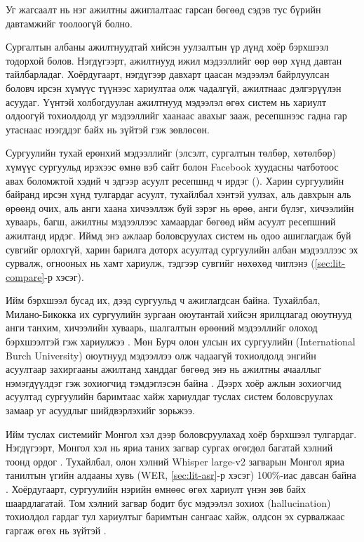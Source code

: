 Уг жагсаалт нь нэг ажилтны ажиглалтаас гарсан бөгөөд сэдэв тус бүрийн давтамжийг тоолоогүй болно.

Сургалтын албаны ажилтнуудтай хийсэн уулзалтын үр дүнд хоёр бэрхшээл тодорхой болов. Нэгдүгээрт, ажилтнууд ижил мэдээллийг өөр өөр хүнд давтан тайлбарладаг. Хоёрдугаарт, нэгдүгээр давхарт цаасан мэдээлэл байрлуулсан боловч ирсэн хүмүүс түүнээс хариултаа олж чадалгүй, ажилтнаас дэлгэрүүлэн асуудаг. Үүнтэй холбогдуулан ажилтнууд мэдээлэл өгөх систем нь хариулт олдоогүй тохиолдолд уг мэдээллийг хаанаас авахыг зааж, ресепшнээс гадна гар утаснаас нээгддэг байх нь зүйтэй гэж зөвлөсөн.

Сургуулийн тухай ерөнхий мэдээллийг (элсэлт, сургалтын төлбөр, хөтөлбөр) хүмүүс сургуульд ирэхээс өмнө вэб сайт болон Facebook хуудасны чатботоос авах боломжтой хэдий ч эдгээр асуулт ресепшнд ч ирдэг (). Харин сургуулийн байранд ирсэн хүнд тулгардаг асуулт, тухайлбал хэнтэй уулзах, аль давхрын аль өрөөнд очих, аль анги хаана хичээллэж буй зэрэг нь өрөө, анги бүлэг, хичээлийн хуваарь, багш, ажилтны мэдээллээс хамаардаг бөгөөд ийм асуулт ресепшний ажилтанд ирдэг. Иймд энэ ажлаар боловсруулах систем нь одоо ашиглагдаж буй сувгийг орлохгүй, харин барилга доторх асуултад сургуулийн албан мэдээллээс эх сурвалж, огнооных нь хамт хариулж, тэдгээр сувгийг нөхөхөд чиглэнэ (\ref{sec:lit-compare}-р хэсэг).

Ийм бэрхшээл бусад их, дээд сургуульд ч ажиглагдсан байна. Тухайлбал, Милано-Бикокка их сургуулийн зургаан оюутантай хийсэн ярилцлагад оюутнууд анги танхим, хичээлийн хуваарь, шалгалтын өрөөний мэдээллийг олоход бэрхшээлтэй гэж хариулжээ \cite{antico2024unimib}. Мөн Бурч олон улсын их сургуулийн (International Burch University) оюутнууд мэдээллээ олж чадаагүй тохиолдолд энгийн асуултаар захиргааны ажилтанд ханддаг бөгөөд энэ нь ажилтны ачааллыг нэмэгдүүлдэг гэж зохиогчид тэмдэглэсэн байна \cite{matic2026burch}. Дээрх хоёр ажлын зохиогчид асуултад сургуулийн баримтаас хайж хариулдаг туслах систем боловсруулах замаар уг асуудлыг шийдвэрлэхийг зорьжээ.

Ийм туслах системийг Монгол хэл дээр боловсруулахад хоёр бэрхшээл тулгардаг. Нэгдүгээрт, Монгол хэл нь яриа таних загвар сургах өгөгдөл багатай хэлний тоонд ордог \cite{mengke2025khalkha}. Тухайлбал, олон хэлний Whisper large-v2 загварын Монгол яриа танилтын үгийн алдааны хувь (\acs{WER}, \ref{sec:lit-asr}-р хэсэг) 100\%-иас давсан байна \cite{radford2023whisper}. Хоёрдугаарт, сургуулийн нэрийн өмнөөс өгөх хариулт үнэн зөв байх шаардлагатай. Том хэлний загвар бодит бус мэдээлэл зохиох (hallucination) тохиолдол гардаг тул хариултыг баримтын сангаас хайж, олдсон эх сурвалжаас гаргаж өгөх нь зүйтэй \cite{lewis2020rag}.

